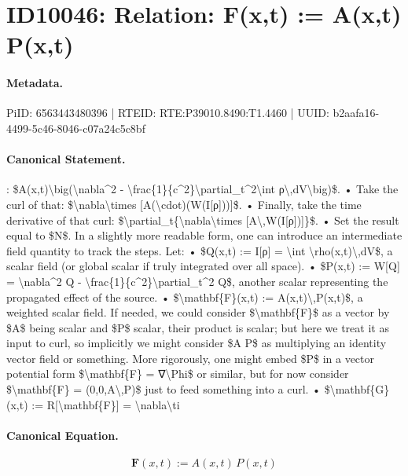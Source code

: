 \section*{ID10046: Relation: F(x,t) := A(x,t) P(x,t)}
\paragraph{Metadata.}
PiID: 6563443480396 | RTEID: RTE:P39010.8490:T1.4460 | UUID: b2aafa16-4499-5c46-8046-c07a24c5c8bf

\paragraph{Canonical Statement.}
: \$A(x,t)\textbackslash{}big(\textbackslash{}nabla\textasciicircum{}2 - \textbackslash{}frac\{1\}\{c\textasciicircum{}2\}\textbackslash{}partial\_t\textasciicircum{}2\textbackslash{}int ρ\textbackslash{},dV\textbackslash{}big)\$. • Take the curl of that: \$\textbackslash{}nabla\textbackslash{}times [A(\textbackslash{}cdot)(W(I[ρ]))]\$. • Finally, take the time derivative of that curl: \$\textbackslash{}partial\_t\{\textbackslash{}nabla\textbackslash{}times [A\textbackslash{},W(I[ρ])]\}\$. • Set the result equal to \$N\$. In a slightly more readable form, one can introduce an intermediate field quantity to track the steps. Let: • \$Q(x,t) := I[ρ] = \textbackslash{}int \textbackslash{}rho(x,t)\textbackslash{},dV\$, a scalar field (or global scalar if truly integrated over all space). • \$P(x,t) := W[Q] = \textbackslash{}nabla\textasciicircum{}2 Q - \textbackslash{}frac\{1\}\{c\textasciicircum{}2\}\textbackslash{}partial\_t\textasciicircum{}2 Q\$, another scalar representing the propagated effect of the source. • \$\textbackslash{}mathbf\{F\}(x,t) := A(x,t)\textbackslash{},P(x,t)\$, a weighted scalar field. If needed, we could consider \$\textbackslash{}mathbf\{F\}\$ as a vector by \$A\$ being scalar and \$P\$ scalar, their product is scalar; but here we treat it as input to curl, so implicitly we might consider \$A P\$ as multiplying an identity vector field or something. More rigorously, one might embed \$P\$ in a vector potential form \$\textbackslash{}mathbf\{F\} = ∇\textbackslash{}Phi\$ or similar, but for now consider \$\textbackslash{}mathbf\{F\} = (0,0,A\textbackslash{},P)\$ just to feed something into a curl. • \$\textbackslash{}mathbf\{G\}(x,t) := R[\textbackslash{}mathbf\{F\}] = \textbackslash{}nabla\textbackslash{}ti

\paragraph{Canonical Equation.}
\[
\mathbf{F}(x,t) := A(x,t)\,P(x,t)
\]

